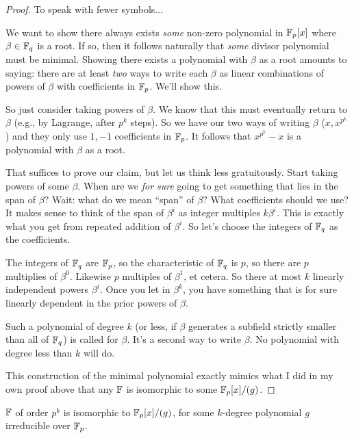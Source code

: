 \begin{proof}
  To speak with fewer symbols...

  We want to show there always exists \emph{some} non-zero polynomial in
  $\mathbb{F}_p[x]$ where $\beta\in\mathbb{F}_q$ is a root. If so, then it follows
  naturally that \emph{some} divisor polynomial must be minimal. Showing
  there exists a polynomial with $\beta$ as a root amounts to saying:
  there are at least \emph{two} ways to write each $\beta$ as linear
  combinations of powers of $\beta$ with coefficients in $\mathbb{F}_p$. We'll
  show this.

  So just consider taking powers of $\beta$. We know that this must
  eventually return to $\beta$ (e.g., by Lagrange, after $p^k$ steps).
  So we have our two ways of writing $\beta$ ($x, x^{p^k}$) and they
  only use $1, -1$ coefficients in $\mathbb{F}_p$. It follows that $x^{p^k} - x$
  is a polynomial with $\beta$ as a root.

  That suffices to prove our claim, but let us think less gratuitously.
  Start taking powers of some $\beta$. When are we \emph{for sure} going
  to get something that lies in the span of $\beta$? Wait: what do we
  mean ``span'' of $\beta$? What coefficients should we use? It makes
  sense to think of the span of $\beta^i$ as integer multiples
  $k\beta^i$. This is exactly what you get from repeated addition of
  $\beta^i$. So let's choose the integers of $\mathbb{F}_q$ as the coefficients.

  The integers of $\mathbb{F}_q$ are $\mathbb{F}_p$, so the characteristic of $\mathbb{F}_q$ is
  $p$, so there are $p$ multiplies of $\beta^0$. Likewise $p$ multiples
  of $\beta^1$, et cetera. So there at most $k$ linearly independent
  powers $\beta^i$. Once you let in $\beta^k$, you have something that
  is for sure linearly dependent in the prior powers of $\beta$.

  Such a polynomial of degree $k$ (or less, if $\beta$ generates a
  subfield strictly smaller than all of $\mathbb{F}_q$) is called
   for $\beta$. It's a second way to write $\beta$. No
  polynomial with degree less than $k$ will do.

  This construction of the minimal polynomial exactly mimics what I did
  in my own proof above that any $\mathbb{F}$ is isomorphic to some $\mathbb{F}_p[x]/(g)$.
\end{proof}

\begin{theorem}
  $\mathbb{F}$ of order $p^k$ is isomorphic to $\mathbb{F}_p[x]/(g)$, for some $k$-degree
  polynomial $g$ irreducible over $\mathbb{F}_p$.
\end{theorem}

